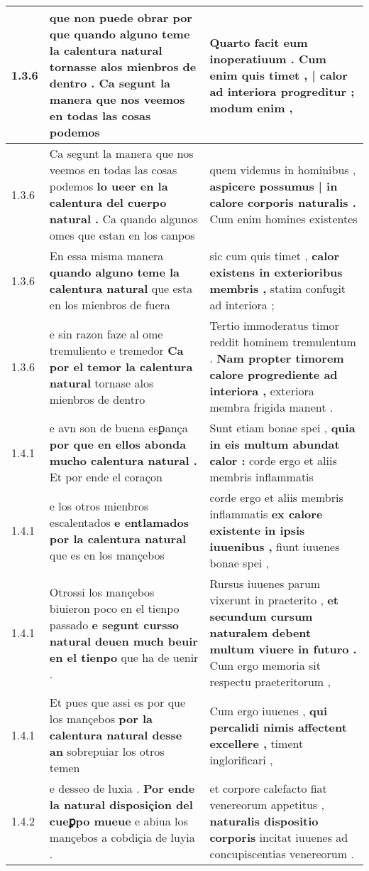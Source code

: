 \begin{tabular}{|p{1cm}|p{6.5cm}|p{6.5cm}|}
1.3.6 & que non puede obrar \textbf{ por que quando alguno teme la calentura natural tornasse alos mienbros de dentro . } Ca segunt la manera que nos veemos en todas las cosas podemos & Quarto facit eum inoperatiuum . \textbf{ Cum enim quis timet , | calor ad interiora progreditur ; } modum enim , \\\hline
1.3.6 & Ca segunt la manera que nos veemos en todas las cosas podemos \textbf{ lo ueer en la calentura del cuerpo natural . } Ca quando algunos omes que estan en los canpos & quem videmus in hominibus , \textbf{ aspicere possumus | in calore corporis naturalis . } Cum enim homines existentes \\\hline
1.3.6 & En essa misma manera \textbf{ quando alguno teme la calentura natural } que esta en los mienbros de fuera & sic cum quis timet , \textbf{ calor existens in exterioribus membris , } statim confugit ad interiora ; \\\hline
1.3.6 & e sin razon faze al ome tremuliento e tremedor \textbf{ Ca por el temor la calentura natural } tornase alos mienbros de dentro & Tertio immoderatus timor reddit hominem tremulentum . \textbf{ Nam propter timorem calore progrediente ad interiora , } exteriora membra frigida manent . \\\hline
1.4.1 & e avn son de buena esꝑança \textbf{ por que en ellos abonda mucho calentura natural . } Et por ende el coraçon & Sunt etiam bonae spei , \textbf{ quia in eis multum abundat calor : } corde ergo et aliis membris inflammatis \\\hline
1.4.1 & e los otros mienbros escalentados \textbf{ e entlamados por la calentura natural } que es en los mançebos & corde ergo et aliis membris inflammatis \textbf{ ex calore existente in ipsis iuuenibus , } fiunt iuuenes bonae spei , \\\hline
1.4.1 & Otrossi los mançebos biuieron poco en el tienpo passado \textbf{ e segunt cursso natural deuen much beuir en el tienpo } que ha de uenir . & Rursus iuuenes parum vixerunt in praeterito , \textbf{ et secundum cursum naturalem debent multum viuere in futuro . } Cum ergo memoria sit respectu praeteritorum , \\\hline
1.4.1 & Et pues que assi es por que los mançebos \textbf{ por la calentura natural desse an } sobrepuiar los otros temen & Cum ergo iuuenes , \textbf{ qui percalidi nimis affectent excellere , } timent inglorificari , \\\hline
1.4.2 & e desseo de luxia . \textbf{ Por ende la natural disposiçion del cueꝑpo mueue } e abiua los mançebos a cobdiçia de luyia . & et corpore calefacto fiat venereorum appetitus , \textbf{ naturalis dispositio corporis } incitat iuuenes ad concupiscentias venereorum . \\\hline

\end{tabular}

